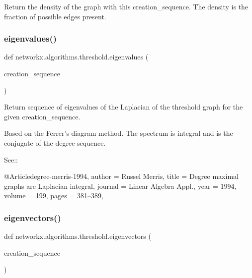 \begin{DoxyVerb}Return the density of the graph with this creation_sequence.
The density is the fraction of possible edges present.
\end{DoxyVerb}
 \mbox{\label{namespacenetworkx_1_1algorithms_1_1threshold_a797878f69758f67495d1854275abf650}} 
\subsubsection{\texorpdfstring{eigenvalues()}{eigenvalues()}}
{\footnotesize\ttfamily def networkx.\+algorithms.\+threshold.\+eigenvalues (\begin{DoxyParamCaption}\item[{}]{creation\+\_\+sequence }\end{DoxyParamCaption})}

\begin{DoxyVerb}Return sequence of eigenvalues of the Laplacian of the threshold
graph for the given creation_sequence.

Based on the Ferrer's diagram method.  The spectrum is integral
and is the conjugate of the degree sequence.

See::

  @Article{degree-merris-1994,
   author = {Russel Merris},
   title = {Degree maximal graphs are Laplacian integral},
   journal = {Linear Algebra Appl.},
   year = {1994},
   volume = {199},
   pages = {381--389},
  }\end{DoxyVerb}
 \mbox{\label{namespacenetworkx_1_1algorithms_1_1threshold_a99b59a1ee1b0881a25fe09af9c935d42}} 
\subsubsection{\texorpdfstring{eigenvectors()}{eigenvectors()}}
{\footnotesize\ttfamily def networkx.\+algorithms.\+threshold.\+eigenvectors (\begin{DoxyParamCaption}\item[{}]{creation\+\_\+sequence }\end{DoxyParamCaption})}

